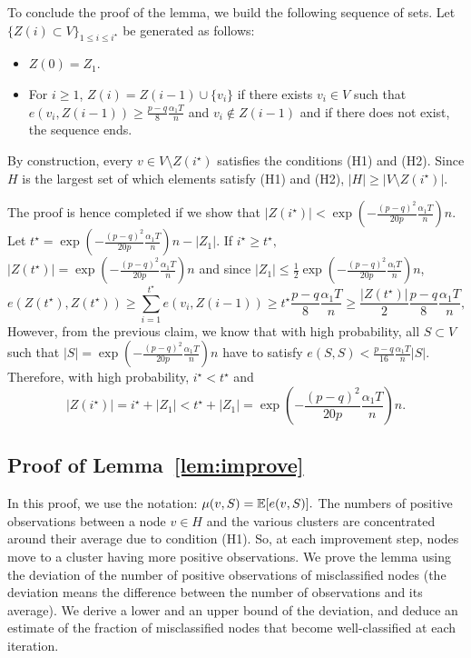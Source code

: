 To conclude the proof of the lemma, we build the following sequence of sets. Let $\{ Z(i) \subset V\}_{1\le i \le i^{\star}}$ be generated as follows:
\begin{itemize}
\item $Z(0)=Z_1$.
\item For $i \ge 1$, $Z(i) = Z(i-1) \cup \{v_i \}$ if  there exists $v_i \in V$ such that $e(v_i , Z(i-1)) \ge \frac{p-q}{8}\frac{\alpha_1 T}{n}$ and $v_i \notin Z(i-1)$ and if there does not exist, the sequence ends.
 \end{itemize}
By construction, every $v \in V\setminus Z(i^\star)$ satisfies the conditions (H1) and (H2). Since $H$ is the largest set of which elements satisfy (H1) and (H2), $|H| \ge |V\setminus Z(i^\star)|$.   

The proof is hence completed if we show that $|Z(i^\star)|<  \exp
\left(-\frac{(p-q)^2 }{20p } \frac{\alpha_1 T}{n}\right) n$. Let
$t^{\star} =  \exp \left(-\frac{(p-q)^2 }{20p } \frac{\alpha_1
    T}{n}\right) n -|Z_1|$. If $i^{\star} \ge t^{\star},$
$|Z(t^{\star})| =  \exp \left(-\frac{(p-q)^2 }{20p } \frac{\alpha_1
    T}{n}\right) n$ and since $|Z_1 | \le \frac{1}{2} \exp \left(-\frac{(p-q)^2
  }{20p } \frac{\alpha_! T}{n}\right) n$,
$$e(Z(t^\star) , Z(t^\star))\ge \sum_{i=1}^{t^\star}e(v_i , Z(i-1)) \ge t^\star  \frac{p-q}{8}\frac{\alpha_1 T}{n} \ge \frac{|Z(t^\star )|}{2}\frac{p-q}{8}\frac{\alpha_1 T}{n},$$
However, from the previous claim, we know that with high probability,
all $S\subset V$ such that $|S| =  \exp \left(-\frac{(p-q)^2 }{20p }
  \frac{\alpha_1 T}{n}\right) n$ have to satisfy $e(S,S) <
\frac{p-q}{16}\frac{\alpha_1 T}{n}|S|$. Therefore, with high
probability, $i^\star < t^\star$ and
$$|Z(i^\star )|=i^{\star}+|Z_1| < t^{\star} + |Z_1| =  \exp \left(-\frac{(p-q)^2 }{20p } \frac{\alpha_1 T}{n}\right) n.$$






\subsection{Proof of Lemma~\ref{lem:improve}}

In this proof, we use the notation: $\mu(v, S) = {\mathbb E} [e(v,S) ].$ The numbers of
positive observations between a node $v\in H$ and the various clusters are concentrated
around their average due to condition (H1). So, at each improvement step,
nodes move to a cluster having more positive observations. We prove the lemma using the deviation of the number of positive observations of misclassified nodes (the deviation means the difference between the number of observations and its average). We derive a lower and an upper bound of the
deviation, and deduce an estimate of the fraction of misclassified nodes that become well-classified at each iteration.

